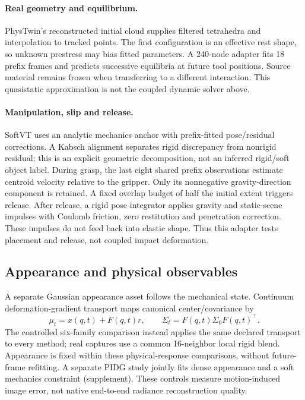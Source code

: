 \documentclass[10pt,twocolumn,letterpaper]{article}
\begin{document}
\paragraph{Real geometry and equilibrium.}
PhysTwin's reconstructed initial cloud supplies filtered tetrahedra and interpolation to tracked points. The first configuration is an effective rest shape, so unknown prestress may bias fitted parameters. A 240-node adapter fits 18 prefix frames and predicts successive equilibria at future tool positions. Source material remains frozen when transferring to a different interaction. This quasistatic approximation is not the coupled dynamic solver above.

\paragraph{Manipulation, slip and release.}
SoftVT uses an analytic mechanics anchor with prefix-fitted pose/residual corrections. A Kabsch alignment separates rigid discrepancy from nonrigid residual; this is an explicit geometric decomposition, not an inferred rigid/soft object label. During grasp, the last eight shared prefix observations estimate centroid velocity relative to the gripper. Only its nonnegative gravity-direction component is retained. A fixed overlap budget of half the initial extent triggers release. After release, a rigid pose integrator applies gravity and static-scene impulses with Coulomb friction, zero restitution and penetration correction. These impulses do not feed back into elastic shape. Thus this adapter tests placement and release, not coupled impact deformation.

\subsection{Appearance and physical observables}
A separate Gaussian appearance asset follows the mechanical state. Continuum deformation-gradient transport maps canonical center/covariance by
\begin{equation}
\mu_t=x(q,t)+F(q,t)r,\qquad\Sigma_t=F(q,t)\Sigma_0F(q,t)^\top.
\end{equation}
The controlled six-family comparison instead applies the same declared transport to every method; real captures use a common 16-neighbor local rigid blend. Appearance is fixed within these physical-response comparisons, without future-frame refitting. A separate PIDG study jointly fits dense appearance and a soft mechanics constraint (supplement). These controls measure motion-induced image error, not native end-to-end radiance reconstruction quality.
\end{document}
